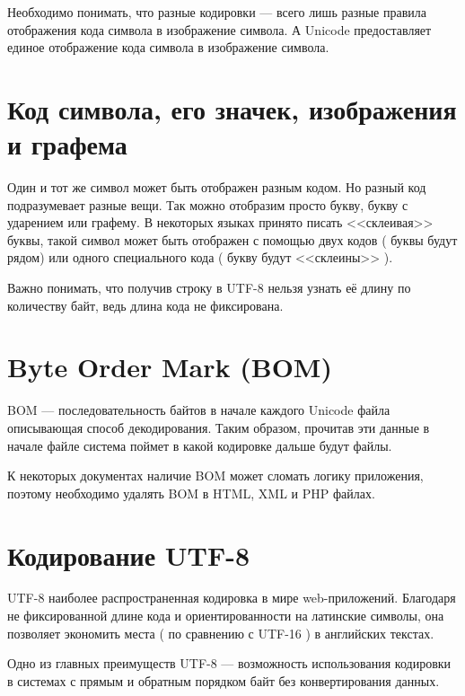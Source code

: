 
Необходимо понимать, что разные кодировки --- всего лишь разные правила отображения кода символа в изображение символа. А Unicode предоставляет единое отображение кода символа в изображение символа.

\section{Код символа, его значек, изображения и графема} \label{sect4_6}

Один и тот же символ может быть отображен разным кодом. Но разный код подразумевает разные вещи. Так можно отобразим просто букву, букву с ударением или графему. В некоторых языках принято писать <<склеивая>> буквы, такой символ может быть отображен с помощью двух кодов ( буквы будут рядом) или одного специального кода ( букву будут <<склеины>> ).


Важно понимать, что получив строку в UTF-8 нельзя узнать её длину по количеству байт, ведь длина кода не фиксирована.


\section{Byte Order Mark (BOM) } \label{sect4_7}

BOM --- последовательность байтов в начале каждого Unicode  файла описывающая способ декодирования. Таким образом, прочитав эти данные в начале файле система поймет в какой кодировке дальше будут файлы.


К некоторых документах наличие BOM может сломать логику приложения, поэтому необходимо удалять BOM в HTML, XML и PHP файлах.

\section{ Кодирование UTF-8 } \label{sect4_8}

UTF-8 наиболее распространенная кодировка в мире web-приложений. Благодаря не фиксированной длине кода и ориентированности на латинские символы, она позволяет экономить места ( по сравнению с UTF-16 ) в английских текстах.


Одно из главных преимуществ UTF-8 --- возможность использования кодировки в системах с прямым и обратным порядком байт без конвертирования данных.

